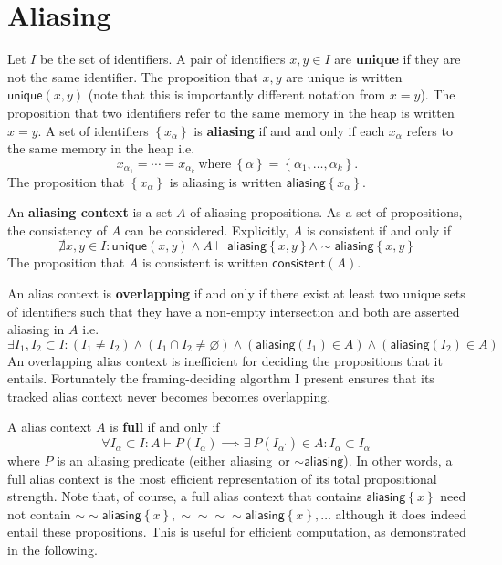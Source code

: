 \documentclass{article}
\newcommand{\tsf}{\textsf}
\newcommand{\tbf}{\textbf}
\newcommand{\set}[1]{\left\{ #1 \right\}}
\newcommand{\p}{^\prime}
\renewcommand{\empty}{\varnothing}
\newcommand{\entails}{\vdash}
\newcommand{\pnot}{\sim}
\newcommand{\aliasing}{\tsf{aliasing}}
\newcommand{\unique}{\tsf{unique}}
\newcommand{\consistent}{\tsf{consistent}}
\begin{document}
\newpage
\section{Aliasing}

Let $I$ be the set of identifiers.
A pair of identifiers $x,y \in I$ are \tbf{unique} if they are not the same identifier.
The proposition that $x,y$ are unique is written $\unique(x,y)$ (note that this is importantly different notation from $x=y$).
The proposition that two identifiers refer to the same memory in the heap is written $x = y$.
A set of identifiers $\set{ x_\alpha }$ is \tbf{aliasing} if and and only if each $x_\alpha$ refers to the same memory in the heap i.e.
$$
x_{\alpha_1} = \cdots = x_{\alpha_k} \ \text{where} \ \set{\alpha} = \set{\alpha_1, \dots, \alpha_k}.
$$
The proposition that $\set{ x_\alpha }$ is aliasing is written $\aliasing \set{ x_\alpha }$.

An \tbf{aliasing context} is a set $A$ of aliasing propositions.
As a set of propositions, the consistency of $A$ can be considered.
Explicitly, $A$ is consistent if and only if
$$
\nexists x,y \in I : \unique(x,y) \land A \entails \aliasing \set{x,y} \land \pnot \aliasing \set{x,y}
$$
The proposition that $A$ is consistent is written $\consistent(A)$.

An alias context is \tbf{overlapping} if and only if there exist at least two unique sets of identifiers such that they have a non-empty intersection and both are asserted aliasing in $A$ i.e.
$$
\exists I_1, I_2 \subset I
:     (I_1 \neq I_2)
\land (I_1 \cap I_2 \neq \empty)
\land (\aliasing (I_1) \in A)
\land (\aliasing (I_2) \in A)
$$
An overlapping alias context is inefficient for deciding the propositions that it entails.
Fortunately the framing-deciding algorthm I present ensures that its tracked alias context never becomes becomes overlapping.

A alias context $A$ is \tbf{full} if and only if
$$
\forall I_\alpha \subset I
:
A \entails P(I_\alpha) \implies \exists \ P(I_{\alpha\p}) \in A : I_\alpha \subset I_{\alpha\p}
$$
where $P$ is an aliasing predicate (either \aliasing \ or $\pnot\aliasing$).
In other words, a full alias context is the most efficient representation of its total propositional strength.
Note that, of course, a full alias context that contains $\aliasing\set{x}$ need not contain $\pnot \pnot \aliasing\set{x}, \pnot \pnot \pnot \pnot \aliasing\set{x}, \dots$ although it does indeed entail these propositions.
This is useful for efficient computation, as demonstrated in the following.
\end{document}
